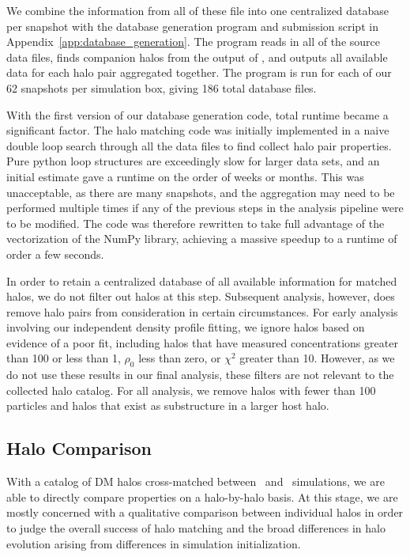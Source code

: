 We combine the information from all of these file into one centralized database per snapshot with the database generation program and submission script in Appendix~\ref{app:database_generation}.  The program reads in all of the source data files, finds companion halos from the output of \crossmatch, and outputs all available data for each halo pair aggregated together.  The program is run for each of our 62 snapshots per simulation box, giving 186 total database files.

With the first version of our database generation code, total runtime became a significant factor.  The halo matching code was initially implemented in a naive double loop search through all the data files to find collect halo pair properties.  Pure python loop structures are exceedingly slow for larger data sets, and an initial estimate gave a runtime on the order of weeks or months.  This was unacceptable, as there are many snapshots, and the aggregation may need to be performed multiple times if any of the previous steps in the analysis pipeline were to be modified.  The code was therefore rewritten to take full advantage of the vectorization of the NumPy library, achieving a massive speedup to a runtime of order a few seconds.

In order to retain a centralized database of all available information for matched halos, we do not filter out halos at this step.  Subsequent analysis, however, does remove halo pairs from consideration in certain circumstances.  For early analysis involving our independent density profile fitting, we ignore halos based on evidence of a poor fit, including halos that have measured concentrations greater than 100 or less than 1, $\rho_{0}$ less than zero, or $\chi^{2}$ greater than 10.  However, as we do not use these results in our final analysis, these filters are not relevant to the collected halo catalog.  For all analysis, we remove halos with fewer than 100 particles and halos that exist as substructure in a larger host halo.




\subsection{Halo Comparison}
\label{subsec:analysis--halo_comparison}


With a catalog of DM halos cross-matched between \lpt\ and \za\ simulations, we are able to directly compare properties on a halo-by-halo basis.  At this stage, we are mostly concerned with a qualitative comparison between individual halos in order to judge the overall success of halo matching and the broad differences in halo evolution arising from differences in simulation initialization.




